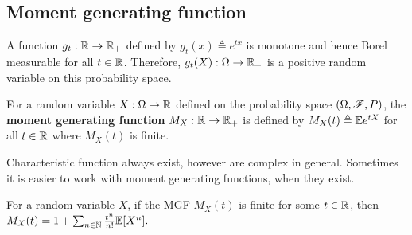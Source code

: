 \documentclass[letterpaper,10pt,english]{article}
\begin{document}
\subsection{Moment generating function}
\begin{shaded}
\begin{exmp} 
A function $g_t: \mathbb{R} \to \mathbb{R}_+$ defined by $g_t(x) \triangleq e^{t x}$ is monotone and hence Borel measurable for all $t \in \mathbb{R}$. 
Therefore, $g_t(X): \Omega \to \mathbb{R}_+$ is a positive random variable on this probability space.  
\end{exmp} 
\end{shaded}
\begin{defn}%
For a random variable $X: \Omega \to \mathbb{R}$ defined on the probability space $(\Omega, \mathscr{F}, P)$, 
the \textbf{moment generating function} $M_X: \mathbb{R} \to \mathbb{R}_+$ is defined by $M_X(t) \triangleq \mathbb{E} e^{t X}$ for all $t \in \mathbb{R}$ where $M_X(t)$ is finite. 
\end{defn}
\begin{rem}
Characteristic function always exist, however are complex in general.  
Sometimes it is easier to work with moment generating functions, when they exist. 
\end{rem}
%
\begin{lem} 
For a random variable $X$, 
if the MGF $M_X(t)$ is finite for some $t \in \mathbb{R}$, 
then $M_X(t) = 1 + \sum_{n \in \mathbb{N}} \frac{t^n}{n!}\mathbb{E}[X^n].$
\end{lem}
\end{document}
